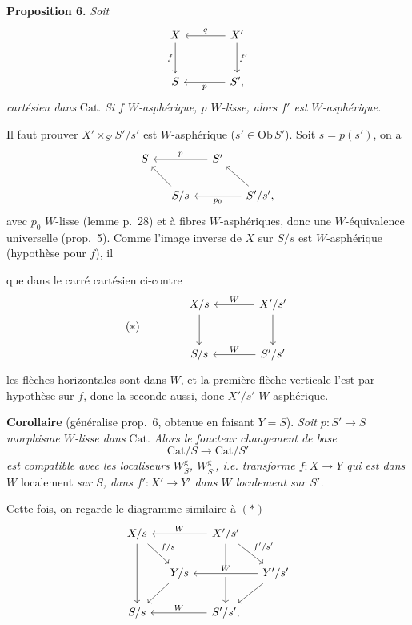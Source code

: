 \documentclass[11pt]{article}
\newcommand{\printedpage}[1]{\marginpar{\footnotesize p.~#1}}
\newcommand{\msp}[1]{\marginpar{\footnotesize [#1]}}
\newcommand{\Cat}{\mathrm{Cat}}
\newcommand{\Ob}{\mathrm{Ob}}
\begin{document}
\printedpage{25}
\textbf{Proposition 6.} \textit{Soit}
\[
\begin{tikzcd}[row sep=large, column sep=large]
X & X' \arrow[l, "q"'] \arrow[d, "f'"] \\
S \arrow[from=u, "f"'] & S', \arrow[l, "p"]
\end{tikzcd}
\]
\textit{cartésien dans} $\Cat$. \textit{Si $f$} \textit{$W$-asphérique, $p$ $W$-lisse, alors $f'$ est $W$-asphérique.}

Il faut prouver $X'\times_{S'}S'/s'$ est $W$-asphérique ($s'\in\Ob\,S'$). Soit $s=p(s')$, on a
\[
\begin{tikzcd}[column sep=small]
S & & S' \arrow[ll, "p"'] & \\
& S/s \arrow[ul] & & S'/s', \arrow[ul] \arrow[ll, "p_0"]
\end{tikzcd}
\]
avec $p_0$ $W$-lisse (lemme p.~28) et à fibres $W$-asphériques, donc une $W$-équivalence universelle (prop.~5). Comme l'image inverse de $X$ sur $S/s$ est $W$-asphérique (hypothèse pour $f$), il

\leavevmode\msp{page 32}que dans le carré cartésien ci-contre
\[
(*)\qquad\qquad
\begin{tikzcd}[row sep=large, column sep=large]
X/s \arrow[d] & X'/s' \arrow[l, "W"'] \arrow[d] \\
S/s & S'/s' \arrow[l, "W"']
\end{tikzcd}
\]
les flèches horizontales sont dans $W$, et la première flèche verticale l'est par hypothèse sur $f$, donc la seconde aussi, donc $X'/s'$ $W$-asphérique.

\textbf{Corollaire} (généralise prop.~6, obtenue en faisant $Y=S$). \textit{Soit $p : S'\longrightarrow S$} \textit{morphisme $W$-lisse dans} $\Cat$. \textit{Alors le foncteur changement de base}
\[
\Cat/S\longrightarrow\Cat/S'
\]
\textit{est compatible avec les localiseurs $W^{\mathrm{g}}_S$, $W^{\mathrm{g}}_{S'}$, i.e. transforme $f : X\longrightarrow Y$ qui est dans $W$} localement \textit{sur $S$, dans $f' : X'\longrightarrow Y'$ dans $W$ localement sur $S'$.}

Cette fois, on regarde le diagramme similaire à $(*)$
\[
\begin{tikzcd}[column sep=small]
X/s \arrow[dd] \arrow[dr, "f/s"] & & X'/s' \arrow[ll, "W"'] \arrow[dd] \arrow[dr, "f'/s'"] & \\
& Y/s \arrow[dl] & & Y'/s' \arrow[ll, "W"', crossing over] \arrow[dl] \\
S/s & & S'/s', \arrow[ll, "W"'] &
\end{tikzcd}
\]
\end{document}
